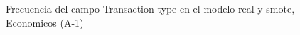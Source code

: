 \begin{figure}[H]
    \centering
    
    \caption{Frecuencia del campo Transaction type en el modelo real y smote, Economicos (A-1)}
    \label{frecuency-Transaction Type-smote-enc}
\end{figure}